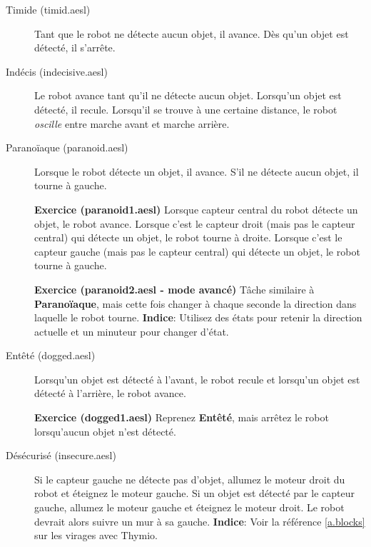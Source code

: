 
\begin{description}

\item[Timide (timid.aesl)] Tant que le robot ne détecte aucun objet, il avance. 
Dès qu'un objet est détecté, il s'arrête.

\item[Indécis (indecisive.aesl)] Le robot avance tant qu'il ne détecte aucun objet.
Lorsqu'un objet est détecté, il recule.
Lorsqu'il se trouve à une certaine distance, le robot \emph{oscille}
entre marche avant et marche arrière.

\item[Paranoïaque (paranoid.aesl)] Lorsque le robot détecte un objet, il avance. S'il ne détecte
aucun objet, il tourne à gauche.

\textbf{Exercice (paranoid1.aesl)} 
Lorsque capteur central du robot détecte un objet, le robot avance.
Lorsque c'est le capteur droit (mais pas le capteur central) qui détecte un objet,
le robot tourne à droite.
Lorsque c'est le capteur gauche (mais pas le capteur central) qui détecte un objet,
le robot tourne à gauche.

\textbf{Exercice (paranoid2.aesl - mode avancé)} 
Tâche similaire à \textbf{Paranoïaque}, mais cette fois changer à chaque seconde la direction dans laquelle le robot tourne. \textbf{Indice}: Utilisez des états pour retenir la direction actuelle
et un minuteur pour changer d'état.

\item[Entêté (dogged.aesl)] Lorsqu'un objet est détecté à l'avant, le robot recule et
lorsqu'un objet est détecté à l'arrière, le robot avance.

\textbf{Exercice (dogged1.aesl)}
Reprenez \textbf{Entêté}, mais arrêtez le robot lorsqu'aucun objet n'est détecté.


\item[Désécurisé (insecure.aesl)]
Si le capteur gauche ne détecte pas d'objet, allumez le moteur droit du robot et éteignez le moteur gauche.
Si un objet est détecté par le capteur gauche, allumez le moteur gauche et éteignez le moteur droit.
Le robot devrait alors suivre un mur à sa gauche.
\textbf{Indice}: Voir la référence \cref{a.blocks} sur les virages avec Thymio.


\end{description}
